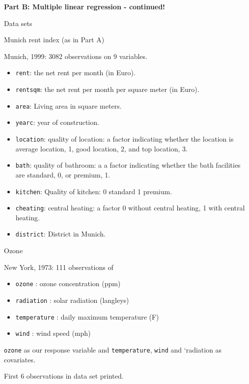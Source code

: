 \documentclass[ignorenonframetext,]{beamer}
\providecommand{\tightlist}{%
  \setlength{\itemsep}{0pt}\setlength{\parskip}{0pt}}
\begin{document}
\begin{frame}[fragile]

\large

\textbf{Part B: Multiple linear regression - continued!}

\normalsize

\begin{block}{Data sets}

\begin{block}{Munich rent index (as in Part A)}

Munich, 1999: 3082 observations on 9 variables.

\begin{itemize}
\tightlist
\item
  \texttt{rent}: the net rent per month (in Euro).
\item
  \texttt{rentsqm}: the net rent per month per square meter (in Euro).
\item
  \texttt{area}: Living area in square meters.
\item
  \texttt{yearc}: year of construction.
\item
  \texttt{location}: quality of location: a factor indicating whether
  the location is average location, 1, good location, 2, and top
  location, 3.
\item
  \texttt{bath}: quality of bathroom: a a factor indicating whether the
  bath facilities are standard, 0, or premium, 1.
\item
  \texttt{kitchen}: Quality of kitchen: 0 standard 1 premium.
\item
  \texttt{cheating}: central heating: a factor 0 without central
  heating, 1 with central heating.
\item
  \texttt{district}: District in Munich.
\end{itemize}

\end{block}

\end{block}

\end{frame}

\begin{frame}[fragile]

\begin{block}{Ozone}

New York, 1973: 111 observations of

\begin{itemize}
\tightlist
\item
  \texttt{ozone} : ozone concentration (ppm)
\item
  \texttt{radiation} : solar radiation (langleys)
\item
  \texttt{temperature} : daily maximum temperature (F)
\item
  \texttt{wind} : wind speed (mph)
\end{itemize}

\texttt{ozone} as our response variable and \texttt{temperature},
\texttt{wind} and `radiation as covariates.

First 6 observations in data set printed.

\end{block}

\end{frame}
\end{document}
